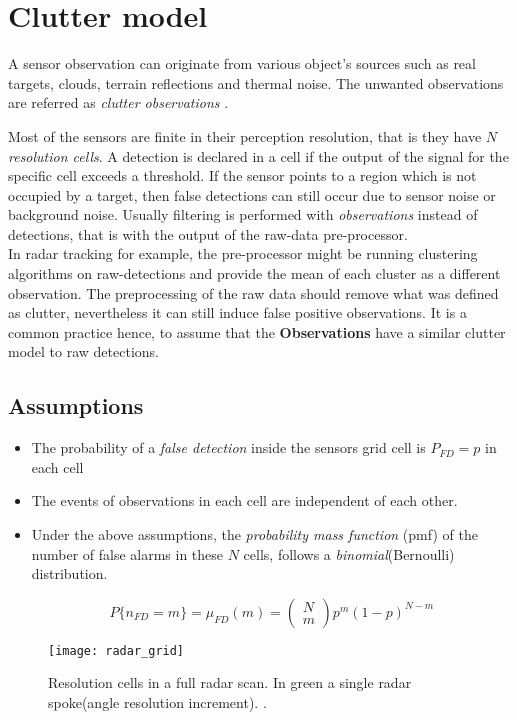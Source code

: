 \section{Clutter model}\label{sec:clutter}
A sensor observation can originate from various object's sources such as real targets, clouds, terrain reflections and thermal noise. The unwanted observations are referred as \emph{clutter observations} \cite{Memon2020}.


Most of the sensors are finite in their perception resolution, that is they have $N$  \emph{resolution cells}. A detection is declared in a cell if  the output of the signal for the specific cell exceeds a threshold. If the sensor points to a region which is not occupied by a target, then false detections can still occur  due to sensor noise or background noise. Usually filtering is performed with \emph{observations} instead of detections, that is with the output of the raw-data pre-processor.\\

In radar tracking for example, the pre-processor might be running clustering algorithms on raw-detections and provide the mean of each cluster as a different observation. The preprocessing of the raw data should remove what was defined as clutter, nevertheless it can still induce false positive observations. It is a common practice hence, to assume that the \textbf{Observations} have a similar clutter model to raw detections.

\subsection{Assumptions}

\begin{itemize}
	\item The probability of a \emph{false detection} inside the sensors grid cell is $P_{FD} = p$ in each cell
	\item The events of observations in each cell are independent of each other.
	\item 
	Under the above assumptions, the \emph{probability mass function} (pmf) of the number of false alarms in these $N$ cells, follows a \emph{binomial}(Bernoulli) distribution.
	
	$$
	P\{n_{FD}=m\} = \mu_{FD}(m) = \begin{pmatrix}N \\m \end{pmatrix} p^m (1-p)^{N-m}
	$$
\end{itemize}
\begin{figure}[H]
	\centering
	\texttt{[image: radar\_grid]}
	\caption{Resolution cells in a full radar scan. In green a single radar spoke(angle resolution increment). \cite{Wilthil2017}.}
	\label{fig:radargrid}
\end{figure}

